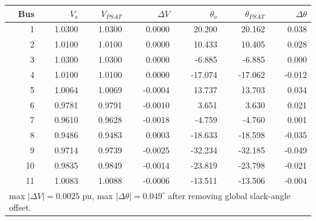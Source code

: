 \begingroup\scriptsize\setlength{\tabcolsep}{3pt}
\begin{tabular}{r r r r r r r}\toprule
Bus & $V_o$ & $V_{PSAT}$ & $\Delta V$ & $\theta_o$ & $\theta_{PSAT}$ & $\Delta\theta$\\\midrule
1 & 1.0300 & 1.0300 & 0.0000 & 20.200 & 20.162 & 0.038\\
2 & 1.0100 & 1.0100 & 0.0000 & 10.433 & 10.405 & 0.028\\
3 & 1.0300 & 1.0300 & 0.0000 & -6.885 & -6.885 & 0.000\\
4 & 1.0100 & 1.0100 & 0.0000 & -17.074 & -17.062 & -0.012\\
5 & 1.0064 & 1.0069 & -0.0004 & 13.737 & 13.703 & 0.034\\
6 & 0.9781 & 0.9791 & -0.0010 & 3.651 & 3.630 & 0.021\\
7 & 0.9610 & 0.9628 & -0.0018 & -4.759 & -4.760 & 0.001\\
8 & 0.9486 & 0.9483 & 0.0003 & -18.633 & -18.598 & -0.035\\
9 & 0.9714 & 0.9739 & -0.0025 & -32.234 & -32.185 & -0.049\\
10 & 0.9835 & 0.9849 & -0.0014 & -23.819 & -23.798 & -0.021\\
11 & 1.0083 & 1.0088 & -0.0006 & -13.511 & -13.506 & -0.004\\
\bottomrule
\multicolumn{7}{l}{\scriptsize max $|\Delta V|=0.0025$ pu, max $|\Delta\theta|=0.049^\circ$ after removing global slack-angle offset.}\\
\end{tabular}\endgroup
